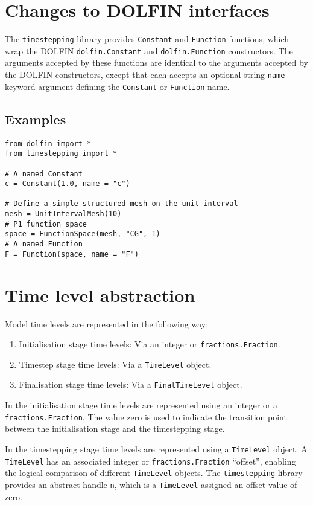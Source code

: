\documentclass[a4paper]{book}
\begin{document}
\section{Changes to DOLFIN interfaces}\label{sect:wrappers}

The \verb+timestepping+ library provides \verb+Constant+ and \verb+Function+
functions, which wrap the DOLFIN \verb+dolfin.Constant+ and
\verb+dolfin.Function+ constructors. The arguments accepted by these functions
are identical to the arguments accepted by the DOLFIN constructors, except that
each accepts an optional string \verb+name+ keyword argument defining the
\verb+Constant+ or \verb+Function+ name.

\subsection*{Examples}

\begin{lstlisting}
from dolfin import *
from timestepping import *

# A named Constant
c = Constant(1.0, name = "c")

# Define a simple structured mesh on the unit interval
mesh = UnitIntervalMesh(10)
# P1 function space
space = FunctionSpace(mesh, "CG", 1)
# A named Function
F = Function(space, name = "F")
\end{lstlisting}

\section{Time level abstraction}

Model time levels are represented in the following way:
\begin{enumerate}
  \item Initialisation stage time levels: Via an integer or
        \verb+fractions.Fraction+.
  \item Timestep stage time levels: Via a \verb+TimeLevel+ object.
  \item Finalisation stage time levels: Via a \verb+FinalTimeLevel+ object.
\end{enumerate}

In the initialisation stage time levels are represented using an integer
or a \verb+fractions.Fraction+. The value zero is used to indicate the
transition point between the initialisation stage and the timestepping stage.

In the timestepping stage time levels are represented using a \verb+TimeLevel+
object. A \verb+TimeLevel+ has an associated integer or
\verb+fractions.Fraction+ ``offset'', enabling the logical comparison of
different \verb+TimeLevel+ objects. The \verb+timestepping+ library provides
an abstract handle \verb+n+, which is a \linebreak \verb+TimeLevel+ assigned an
offset value of zero.
\end{document}
